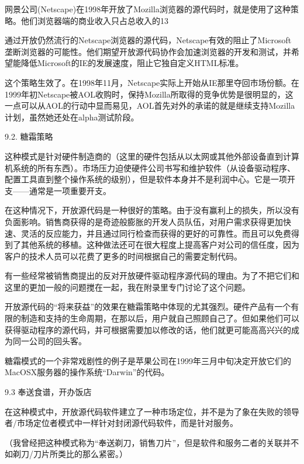 \documentclass[a4paper,12pt,UTF8,twoside]{ctexbook}
\begin{document}
网景公司(Netscape)在1998年开放了Mozilla浏览器的源代码时，就是使用了这种策略。他们浏览器端的商业收入只占总收入的13%


通过开放仍然流行的Netscape浏览器的源代码，Netscape有效的阻止了Microsoft垄断浏览器的可能性。他们期望开放源代码协作会加速浏览器的开发和测试，并希望能降低Microsoft的IE的发展速度，阻止它独自定义HTML标准。


这个策略生效了。在1998年11月，Netscape实际上开始从IE那里夺回市场份额。在1999年初Netscape被AOL收购时，保持Mozilla所取得的竞争优势是很明显的，这一点可以从AOL的行动中显而易见，AOL首先对外的承诺的就是继续支持Mozilla计划，虽然她还处在alpha测试阶段。


9.2. 糖霜策略


这种模式是针对硬件制造商的（这里的硬件包括从以太网或其他外部设备直到计算机系统的所有东西）。市场压力迫使硬件公司书写和维护软件（从设备驱动程序、配置工具直到整个操作系统的级别），但是软件本身并不是利润中心。它是一项开支——通常是一项重要开支。


在这种情况下，开放源代码是一种很好的策略。由于没有赢利上的损失，所以没有负面影响。销售商获得的是奇迹般膨胀的开发人员队伍，对用户需求获得更加快速、灵活的反应能力，并且通过同行检查而获得的更好的可靠性。而且可以免费得到了其他系统的移植。这种做法还可在很大程度上提高客户对公司的信任度，因为客户的技术人员可以花费了更多的时间根据自己的需要定制代码。


有一些经常被销售商提出的反对开放硬件驱动程序源代码的理由。为了不把它们和这里的更加一般的问题搅在一起，我在附录里专门讨论了这个问题。


开放源代码的“将来获益”的效果在糖霜策略中体现的尤其强烈。硬件产品有一个有限的制造和支持的生命周期，在那以后，用户就自己照顾自己了。但如果他们可以获得驱动程序的源代码，并可根据需要加以修改的话，他们就更可能高高兴兴的成为同一公司的回头客。


糖霜模式的一个非常戏剧性的例子是苹果公司在1999年三月中旬决定开放它们的MacOSX服务器的操作系统“Darwin”的代码。


9.3 奉送食谱，开办饭店


在这种模式中，开放源代码软件建立了一种市场定位，并不是为了象在失败的领导者/市场定位者模式中一样针对封闭源代码软件，而是针对服务。


（我曾经把这种模式称为“奉送剃刀，销售刀片”，但是软件和服务二者的关联并不如剃刀/刀片所类比的那么紧密。）
\end{document}
